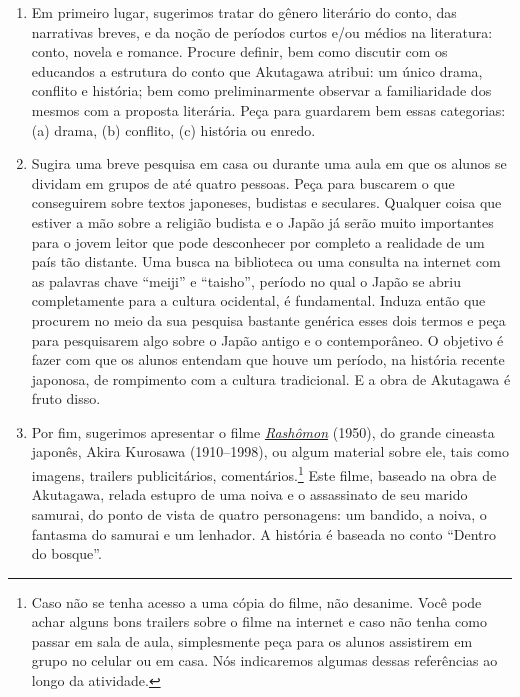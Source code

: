 \documentclass[12pt]{extarticle}
\begin{document}
\begin{enumerate} 
\item Em primeiro lugar, sugerimos tratar do gênero literário
do conto,  das narrativas breves, e da noção de períodos curtos e/ou
médios na literatura: conto, novela e romance.  Procure definir, bem como
discutir com os educandos a estrutura do conto que Akutagawa atribui: um
único drama, conflito e história; bem como preliminarmente observar a
familiaridade dos mesmos com a proposta literária. Peça para guardarem
bem essas categorias: (a) drama, (b) conflito, (c) história ou enredo.

\item Sugira uma breve pesquisa em casa ou durante uma aula em que os alunos se
dividam em grupos de até quatro pessoas. Peça para buscarem o que conseguirem
sobre textos japoneses, budistas e seculares. Qualquer coisa que estiver a
mão sobre a religião budista e o Japão já serão muito importantes para o
jovem leitor que pode desconhecer por completo a realidade de um país tão
distante. Uma busca na biblioteca ou uma consulta na internet com as
palavras chave ``meiji'' e ``taisho'', período no qual o Japão se abriu
completamente para a cultura ocidental, é fundamental. Induza então que
procurem no meio da sua pesquisa bastante genérica esses dois termos e peça
para pesquisarem algo sobre o Japão antigo e o contemporâneo. O objetivo é
fazer com que os alunos entendam que houve um período, na história recente
japonosa, de rompimento com a cultura tradicional. E a obra de Akutagawa é
fruto disso.  

\item Por fim, sugerimos apresentar o filme
\href{https://www.youtube.com/watch?v=xCZ9TguVOIA}{\textit{Rashômon}} (1950),
do grande cineasta japonês, Akira Kurosawa (1910--1998), ou algum material
sobre ele, tais como imagens, trailers publicitários,
comentários.\footnote{Caso não se tenha acesso a uma cópia do filme, não
desanime. Você pode achar alguns bons trailers sobre o filme na internet e
caso não tenha como passar em sala de aula, simplesmente peça para os
alunos assistirem em grupo no celular ou em casa.  Nós indicaremos algumas
dessas referências ao longo da atividade.} Este filme, baseado na obra de
Akutagawa, relada estupro de uma noiva e o assassinato de seu marido
samurai, do ponto de vista de quatro personagens: um bandido, a noiva, o
fantasma do samurai e um lenhador.  A história é baseada no conto ``Dentro do
bosque''.  

\end{enumerate}
\end{document}
